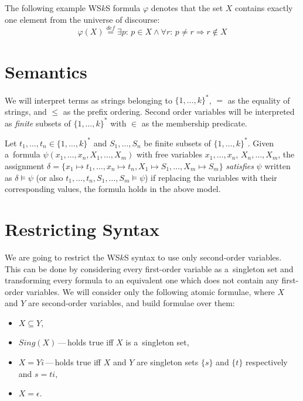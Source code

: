   \noindent\hrulefill
  \begin{example}
  The following example WS$k$S formula $\varphi$ denotes that the set $X$
  contains exactly one element from the universe of discourse:
  \begin{equation}
   \varphi(X) \overset{\mathit{def}}{=} \exists p:\,p \in X \wedge \forall r:\,
   p \neq r \Rightarrow r \not\in X
  \end{equation}
   \hrulefill
  \end{example}\label{wsks-formula}
  
  \section{Semantics}
	
We will interpret terms as strings belonging to $\{1,\ldots,k\}^*$, $=$ as the
equality of strings, and $\leq$ as the prefix ordering. Second order variables
will be interpreted as \emph{finite} subsets of $\{1,\ldots,k\}^*$ with
$\in$ as the membership predicate.
	
Let $t_1,\ldots,t_n \in \{1,\ldots,k\}^*$ and $S_1,\ldots,S_n$ be finite subsets
of $\{1,\ldots,k\}^*$. Given a~formula $\psi(x_1,\ldots,x_n,X_1,\ldots,X_m)$
with free variables $x_1,\ldots,x_n$, $X_n,\ldots,X_m$, the assignment $\delta =
\{ x_1 \mapsto t_1,\ldots, x_n \mapsto t_n, X_1 \mapsto S_1,\ldots, X_m \mapsto
S_m\}$ \emph{satisfies} $\psi$ written as $\delta \models \psi$ (or also
$t_1,\ldots, t_n, S_1,\ldots,S_m \models \psi$) if replacing the variables with
their corresponding values, the formula holds in the above model.
	
  \section{Restricting Syntax}\label{restricted}
	We are going to restrict the WS$k$S syntax to use only second-order variables.
	This can be done by considering every first-order variable as a~singleton set
	and transforming every formula to an equivalent one which does not contain any
	first-order variables. We will consider only the following atomic formulae,
	where $X$ and $Y$ are second-order variables, and build formulae over them:
	\begin{itemize}
	 \item $X \subseteq Y$,
\item $\mathit{Sing}(X)$\,---\,holds true iff $X$ is a~singleton set, \item $X
= Yi$\,---\,holds true iff $X$ and $Y$ are singleton sets $\{s\}$ and $\{t\}$
respectively and $s = ti$,
	 \item $X = \epsilon$.
	\end{itemize}
	
